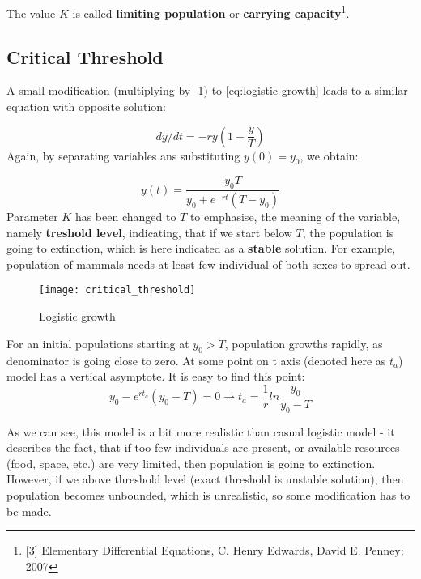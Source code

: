 The value $K$ is called \textbf{limiting population} or \textbf{carrying capacity}\footnote{[3] Elementary Differential Equations, C. Henry Edwards, David E. Penney; 2007}.

\subsection{Critical Threshold}
A small modification (multiplying by -1) to \ref{eq:logistic growth} leads to a similar equation with opposite solution:

\begin{equation} \label{eq:critical treshold}
dy/dt = -ry(1 - \frac{y}{T})
\end{equation}
Again, by separating variables ans substituting $y(0) = y_0$, we obtain:

\begin{equation} \label{eq:critical treshold solution}
y(t) = \frac{y_0 T}{y_0 + e^{-rt}(T - y_0)}
\end{equation}
Parameter $K$ has been changed to $T$ to emphasise, the meaning of the variable, namely \textbf{treshold level}, indicating, that if we start below $T$, the population is going to extinction, which is here indicated as a \textbf{stable} solution. For example, population of mammals needs at least few individual of both sexes to spread out.

\begin{figure}[h]
\centering
\texttt{[image: critical\_threshold]}
\caption{Logistic growth}
\label{fig:logistic growth}
\end{figure}

For an initial populations starting at $y_0 > T$, population growths rapidly, as denominator is going close to zero. At some point on t axis (denoted here as $t_a$) model has a vertical asymptote. It is easy to find this point:
\begin{equation}
y_0 - e^{rt_a}(y_0 - T) = 0 \rightarrow t_a = \frac{1}{r}ln\frac{y_0}{y_0 - T}
\end{equation}

As we can see, this model is a bit more realistic than casual logistic model - it describes the fact, that if too few individuals are present, or available resources (food, space, etc.) are very limited, then population is going to extinction. However, if we above threshold level (exact threshold is unstable solution), then population becomes unbounded, which is unrealistic, so some modification has to be made.

